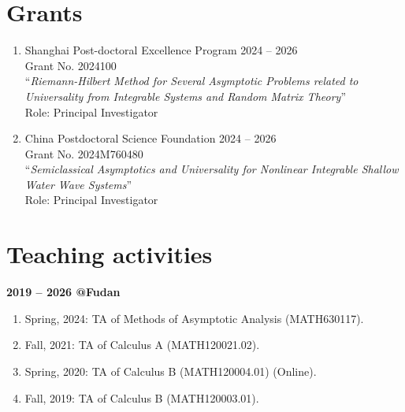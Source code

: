 \documentclass[margin]{res}
\begin{document}
\begin{resume}
\section{Grants}
\begin{enumerate}[--]
\item Shanghai Post-doctoral Excellence Program \hfill 2024 -- 2026  \\
Grant No. 2024100\\
``{\sl Riemann-Hilbert Method for Several Asymptotic Problems related to Universality from Integrable Systems and Random Matrix Theory}''  \\
Role: Principal Investigator

\item China Postdoctoral Science Foundation  \hfill 2024 -- 2026\\
Grant No. 2024M760480\\
``{\sl Semiclassical Asymptotics and Universality for Nonlinear Integrable Shallow Water Wave Systems}'' \\
Role: Principal Investigator
\end{enumerate}



\section{Teaching activities}
\textbf{2019 -- 2026 @Fudan}
\begin{enumerate}[--]
\item Spring, 2024: TA of Methods of Asymptotic Analysis (MATH630117).
\item Fall, 2021: TA of Calculus A (MATH120021.02).
\item Spring, 2020: TA of Calculus B (MATH120004.01) (Online).
\item Fall, 2019: TA of Calculus B (MATH120003.01).
\end{enumerate}



\end{resume}
\end{document}
